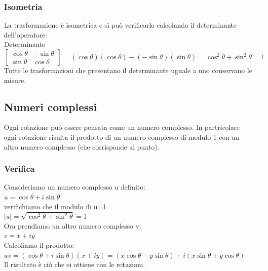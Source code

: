 \documentclass[a4paper]{article}
\begin{document}
\subsubsection{Isometria}
La trasformazione è isometrica e si può verificarlo calcolando il determinante dell'operatore:
\\Determinante$\left[\begin{matrix}\cos\theta & -\sin\theta\\ \sin\theta & \cos\theta\end{matrix}\right]= (\cos\theta)(\cos\theta)-(-\sin\theta)(\sin\theta)= \cos^2\theta+\sin^2\theta=1
$
\\Tutte le trasformazioni che presentano il determinante uguale a uno conservano le misure.
\subsection{Numeri complessi}
Ogni rotazione può essere pensata come un numero complesso. In partricolare ogni rotazione risulta il prodotto di un numero complesso di modulo 1 con un altro numero complesso (che corrisponde al punto).
\subsubsection{Verifica}
Consideriamo un numero complesso u definito:
\\$u=\cos\theta+\textit{i}\sin\theta
$
\\verifichiamo che il modulo di u=1
\\$ |u|=\sqrt{\cos^2\theta+\sin^2\theta}=1
$
\\Ora prendiamo un altro numero complesso v:
\\ $v=x+\textit{i}y 
$
\\Calcoliamo il prodotto:
\\ $uv=(\cos\theta+\textit{i}\sin\theta)(x+\textit{i}y)=(x\cos\theta-y\sin\theta)+\textit{i}(x\sin\theta+y\cos\theta)
$
\\Il risultato è ciò che si ottiene con le rotazioni.
\end{document}
